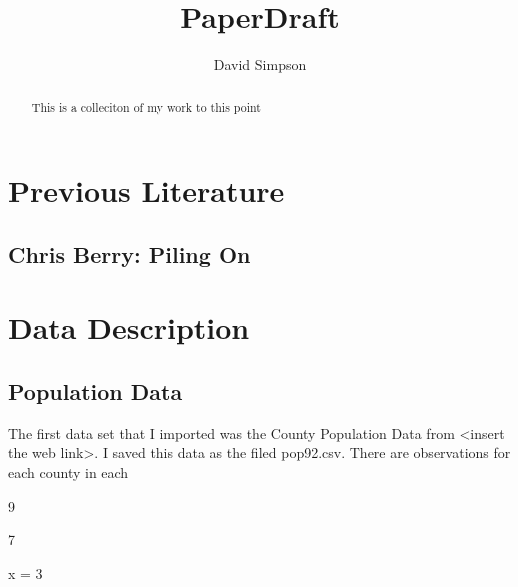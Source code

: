 \documentclass{article}
\title{PaperDraft}
\author{David Simpson}
\begin{document}


\maketitle
\begin{abstract}
This is a colleciton of my work to this point
\end{abstract}

\section{Previous Literature}

\subsection{Chris Berry: Piling On}


\section{Data Description}

\subsection{Population Data}
The first data set that I imported was the County Population Data from <insert the web link>. I saved this data as the filed pop92.csv. There are observations for each county in each 



\begin{Schunk}
\begin{Soutput}
[1] 9
\end{Soutput}
\begin{Soutput}
[1] 7
\end{Soutput}
\end{Schunk}

x = 3 
\end{document}
